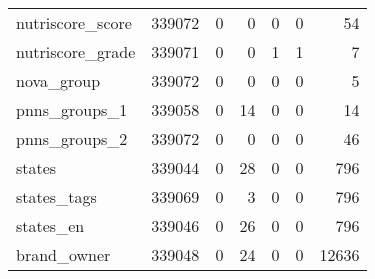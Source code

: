 \begin{tabular}{lrrrrrr}
nutriscore\_score                           &                                        339072 &                                         0 &                                             0 &                                         0 &                      0 &               54 \\
nutriscore\_grade                           &                                        339071 &                                         0 &                                             0 &                                         1 &                      1 &                7 \\
nova\_group                                 &                                        339072 &                                         0 &                                             0 &                                         0 &                      0 &                5 \\
pnns\_groups\_1                              &                                        339058 &                                         0 &                                            14 &                                         0 &                      0 &               14 \\
pnns\_groups\_2                              &                                        339072 &                                         0 &                                             0 &                                         0 &                      0 &               46 \\
states                                     &                                        339044 &                                         0 &                                            28 &                                         0 &                      0 &              796 \\
states\_tags                                &                                        339069 &                                         0 &                                             3 &                                         0 &                      0 &              796 \\
states\_en                                  &                                        339046 &                                         0 &                                            26 &                                         0 &                      0 &              796 \\
brand\_owner                                &                                        339048 &                                         0 &                                            24 &                                         0 &                      0 &            12636 \\

\end{tabular}
